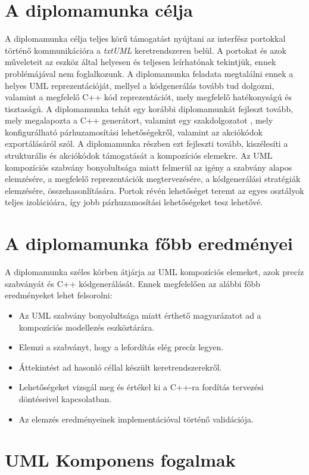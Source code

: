 \documentclass[a4paper,12pt]{report}
\begin{document}
\section{A diplomamunka célja}
A diplomamunka célja teljes körű támogatást nyújtani az interfész portokkal történő kommunikációra a \textit{txtUML} keretrendszeren belül. A portokat és azok műveleteit az eszköz által helyesen és teljesen leírhatónak tekintjük, ennek problémájával nem foglalkozunk. A diplomamunka feladata megtalálni ennek a helyes UML reprezentációját, mellyel a kódgenerálás tovább tud dolgozni, valamint a megfelelő C++ kód reprezentációt, mely megfelelő hatékonyságú és tisztaságú. A diplomamunka tehát egy korábbi diplomamunkát fejleszt tovább\cite{hack_dip}, mely megalapozta a C++ generátort, valamint egy szakdolgozatot \cite{my_szakdolg}, mely konfigurálható párhuzamosítási lehetőségekről, valamint az akciókódok exportálásáról szól. A diplomamunka részben ezt fejleszti tovább, kiszélesíti a strukturális és akciókódok támogatását a kompozíciós elemekre. Az UML kompozíciós szabvány bonyolultsága miatt felmerül az igény a szabvány alapos elemzésére, a megfelelő reprezentációk megtervezésére, a kódgenerálási stratégiák elemzésére, összehasonlítására. Portok révén lehetőséget teremt az egyes osztályok teljes izolációára, így jobb párhuzamosítási lehetőségeket tesz lehetővé.

\section{A diplomamunka főbb eredményei}
A diplomamunka széles körben átjárja az UML kompozíciós elemeket, azok precíz szabványát és C++ kódgenerálását. Ennek megfelelően az alábbi főbb eredményeket lehet felsorolni:
\begin{itemize}
\item Az UML szabvány bonyolultsága miatt érthető magyarázatot ad a kompozíciós modellezés eszköztárára.
\item Elemzi a szabványt, hogy a lefordítás elég precíz legyen.
\item Áttekintést ad hasonló céllal készült keretrendszerekről.
\item Lehetőségeket vizsgál meg és értékel ki a C++-ra fordítás tervezési döntéseivel kapcsolatban.
\item Az elemzés eredményeinek implementációval történő validációja.
\end{itemize}

\section{UML Komponens fogalmak}
\end{document}
